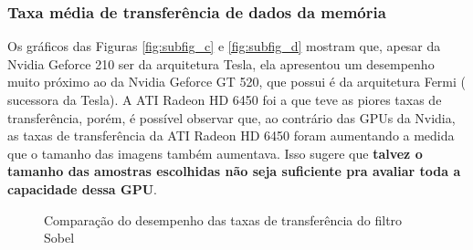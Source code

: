 \subsubsection{Taxa média de transferência de dados da memória}
Os gráficos das Figuras \ref{fig:subfig_c} e \ref{fig:subfig_d} mostram que, apesar da Nvidia Geforce 210 ser da arquitetura Tesla, ela apresentou um desempenho muito próximo ao da Nvidia Geforce GT 520, que possui é da arquitetura Fermi ( sucessora da Tesla). A ATI Radeon HD 6450 foi a que teve as piores taxas de transferência, porém, é possível observar que, ao contrário das GPUs da Nvidia, as taxas de transferência da ATI Radeon HD 6450 foram aumentando a medida que o tamanho das imagens também aumentava. Isso sugere que \textbf{talvez o tamanho das amostras escolhidas não seja suficiente pra avaliar toda a capacidade dessa GPU}.
\FloatBarrier
\begin{figure}[!ht]
\centering
{}
\centering
{}
\label{fig:taxa_transfer}
\caption{Comparação do desempenho das taxas de transferência do filtro Sobel}
\end{figure}
\FloatBarrier

